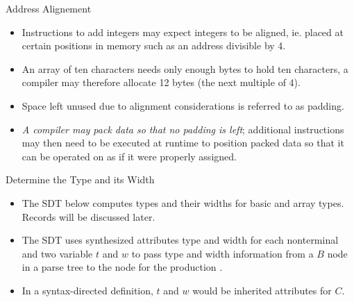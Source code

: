 \begin{bibunit}[apalike]
\begin{frame}[b]{Address Alignement}
	\begin{footnotesize}
	\begin{examples}
		\begin{itemize}
		\item Instructions to add integers may expect integers to be aligned, ie. placed at certain positions in memory such as an address divisible by 4.
		\item An array of ten characters needs only enough bytes to hold ten characters, a compiler may therefore allocate 12 bytes (the next multiple of 4).
		\end{itemize}
	\end{examples}
	\begin{itemize}
	\item  Space left unused due to alignment considerations is referred to as padding.
	\item \emph{A compiler may pack data so that no padding is left}; additional instructions may then need to be executed at runtime to position packed data so that it can be operated on as if it were properly assigned.
	\end{itemize}
	\end{footnotesize}
\end{frame}

\begin{frame}{Determine the Type and its Width}
	\begin{itemize}
	\item The SDT below computes types and their widths for basic and array types. Records will be discussed later.
		\begin{sdd}[\linewidth]
		\end{sdd}
		\vfill
	\item The SDT uses synthesized attributes type and width for each nonterminal and two variable $t$ and $w$ to pass type and width information from a $B$ node in a parse tree to the node for the production .
	\item In a syntax-directed definition, $t$ and $w$ would be inherited attributes for $C$.
	\end{itemize}
\end{frame}


\end{bibunit}
